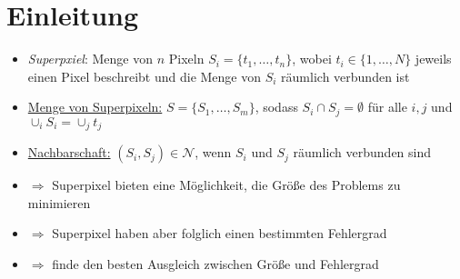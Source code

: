 \section{Einleitung}

\begin{itemize}
  \item \emph{Superpxiel}: Menge von $n$ Pixeln $S_i = \lbrace t_1, \ldots, t_n \rbrace$, wobei $t_i \in \lbrace 1, \ldots, N \rbrace$ jeweils einen Pixel beschreibt und die Menge von $S_i$ räumlich verbunden ist
  \item \underline{Menge von Superpixeln:} $S = \lbrace S_1, \ldots, S_m \rbrace$, sodass $S_i \cap S_j = \emptyset$ für alle $i, j$ und $\cup_i S_i = \cup_j t_j$
  \item \underline{Nachbarschaft:} $(S_i, S_j) \in \mathcal{N}$, wenn $S_i$ und $S_j$ räumlich verbunden sind
  \item $\Rightarrow$ Superpixel bieten eine Möglichkeit, die Größe des Problems zu minimieren
  \item $\Rightarrow$ Superpixel haben aber folglich einen bestimmten Fehlergrad
  \item $\Rightarrow$ finde den besten Ausgleich zwischen Größe und Fehlergrad
\end{itemize}
